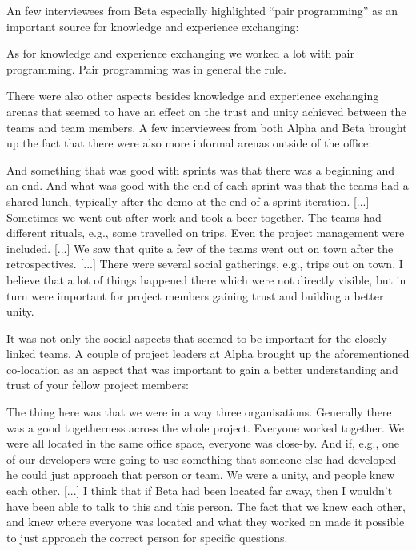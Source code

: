 An few interviewees from Beta especially highlighted ``pair programming'' as an important source for knowledge and experience exchanging:

\begin{fancyquotes}
As for knowledge and experience exchanging we worked a lot with pair programming. Pair programming was in general the rule.
\end{fancyquotes}

There were also other aspects besides knowledge and experience exchanging arenas that seemed to have an effect on the trust and unity achieved between the teams and team members. A few interviewees from both Alpha and Beta brought up the fact that there were also more informal arenas outside of the office:

\begin{fancyquotes}
And something that was good with sprints was that there was a beginning and an end. And what was good with the end of each sprint was that the teams had a shared lunch, typically after the demo at the end of a sprint iteration. [...] Sometimes we went out after work and took a beer together. The teams had different rituals, e.g., some travelled on trips. Even the project management were included. [...] We saw that quite a few of the teams went out on town after the retrospectives. [...] There were several social gatherings, e.g., trips out on town. I believe that a lot of things happened there which were not directly visible, but in turn were important for project members gaining trust and building a better unity.
\end{fancyquotes}

It was not only the social aspects that seemed to be important for the closely linked teams. A couple of project leaders at Alpha brought up the aforementioned co-location as an aspect that was important to gain a better understanding and trust of your fellow project members:

\begin{fancyquotes}
The thing here was that we were in a way three organisations. Generally there was a good togetherness across the whole project. Everyone worked together. We were all located in the same office space, everyone was close-by. And if, e.g., one of our developers were going to use something that someone else had developed he could just approach that person or team. We were a unity, and people knew each other. [...] I think that if Beta had been located far away, then I wouldn't have been able to talk to this and this person. The fact that we knew each other, and knew where everyone was located and what they worked on made it possible to just approach the correct person for specific questions.
\end{fancyquotes}

